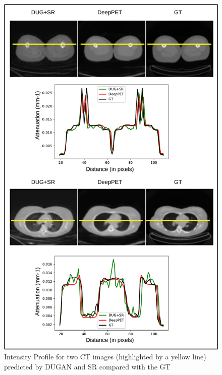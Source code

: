 \begin{figure}[!htbp]
	\centering
	\includegraphics[width=0.8\linewidth]{./Figures/CT_ip2-crop.pdf}
	\caption{Intensity Profile for two \ac{CT} images (highlighted by a yellow line) predicted by \ac{DUGAN} and \ac{SR} compared with the \ac{GT}}
	\label{fig:CT_ip}
\end{figure}

